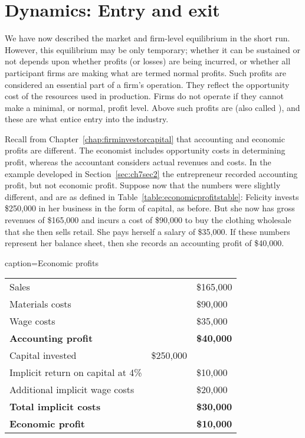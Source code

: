 \section{Dynamics: Entry and exit}\label{sec:ch9sec4}

We have now described the market and firm-level equilibrium in the short
run. However, this equilibrium may be only temporary; whether it can be
sustained or not depends upon whether profits (or losses) are being
incurred, or whether all participant firms are making what are termed %
normal profits. Such profits are considered an essential part
of a firm's operation. They reflect the opportunity cost of the resources
used in production. Firms do not operate if they cannot make a minimal, or
normal, profit level. Above such profits are 
(also called ), and these are what entice
entry into the industry.

Recall from Chapter~\ref{chap:firminvestorcapital} that accounting and economic profits are different.
The economist includes opportunity costs in determining profit, whereas the
accountant considers actual revenues and costs. In the example developed in
Section~\ref{sec:ch7sec2} the entrepreneur recorded accounting profit, but not economic
profit. Suppose now that the numbers were slightly different, and are as
defined in Table~\ref{table:economicprofitstable}: Felicity
invests \$250,000 in her business in the form of capital, as before. But she
now has gross revenues of \$165,000 and incurs a cost of \$90,000 to buy the
clothing wholesale that she then sells retail. She pays herself a salary of
\$35,000. If these numbers represent her balance sheet, then she records an
accounting profit of \$40,000.

\begin{Table}{caption={Economic profits \label{table:economicprofitstable}}}
\begin{tabu} to 30em {|X[2,l]X[1,c]X[1,c]|}	\hline
		Sales &  & \$165,000 \\ 
	Materials costs &  & \$90,000 \\ 
		Wage costs &  & \$35,000 \\ 
	\textbf{Accounting profit} &  & \textbf{\$40,000} \\ 
		Capital invested & \$250,000 &  \\ 
	Implicit return on capital at 4\% &  & \$10,000 \\ 
		Additional implicit wage costs &  & \$20,000 \\ 
	\textbf{Total implicit costs} &  & \textbf{\$30,000} \\ 
		\textbf{Economic profit} &  & \textbf{\$10,000}	\\	\hline
\end{tabu}
\end{Table}

